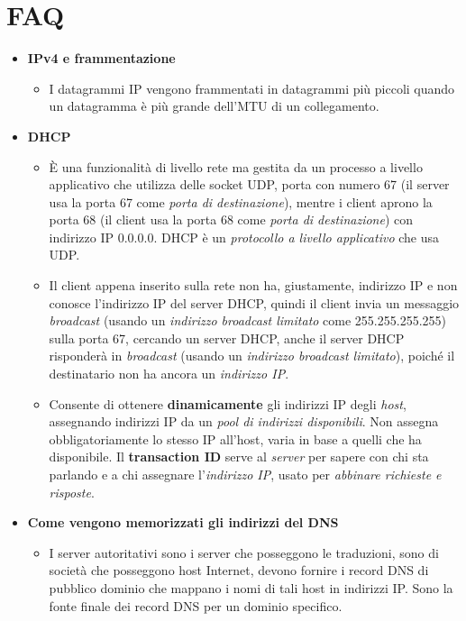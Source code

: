 \section{FAQ}
\begin{itemize}
    \item \textbf{IPv4 e frammentazione}
        \begin{itemize}
            \item I datagrammi IP vengono frammentati in datagrammi più piccoli quando un datagramma è più grande dell'MTU di un collegamento.
        \end{itemize}
    \item \textbf{DHCP}
        \begin{itemize}
            \item È una funzionalità di livello rete ma gestita da un processo a livello applicativo che utilizza delle socket UDP, porta con numero 67 (il server usa la porta 67 come \textit{porta di destinazione}), mentre i client aprono la porta 68 (il client usa la porta 68 come \textit{porta di destinazione}) con indirizzo IP $0.0.0.0$. DHCP è un \textit{protocollo a livello applicativo} che usa UDP.
            \item Il client appena inserito sulla rete non ha, giustamente, indirizzo IP e non conosce l'indirizzo IP del server DHCP, quindi il client invia un messaggio \textit{broadcast} (usando un \textit{indirizzo broadcast limitato} come 255.255.255.255) sulla porta 67, cercando un server DHCP, anche il server DHCP risponderà in \textit{broadcast} (usando un \textit{indirizzo broadcast limitato}), poiché il destinatario non ha ancora un \textit{indirizzo IP}.
            \item Consente di ottenere \textbf{dinamicamente} gli indirizzi IP degli \textit{host}, assegnando indirizzi IP da un \textit{pool di indirizzi disponibili}. Non assegna obbligatoriamente lo stesso IP all'host, varia in base a quelli che ha disponibile. Il \textbf{transaction ID} serve al \textit{server} per sapere con chi sta parlando e a chi assegnare l'\textit{indirizzo IP}, usato per \textit{abbinare richieste e risposte}.
        \end{itemize}
    \item \textbf{Come vengono memorizzati gli indirizzi del DNS}
        \begin{itemize}
            \item I server autoritativi sono i server che posseggono le traduzioni, sono di società che posseggono host Internet, devono fornire i record DNS di pubblico dominio che mappano i nomi di tali host in indirizzi IP. Sono la fonte finale dei record DNS per un dominio specifico.

\end{itemize}
\end{itemize}
